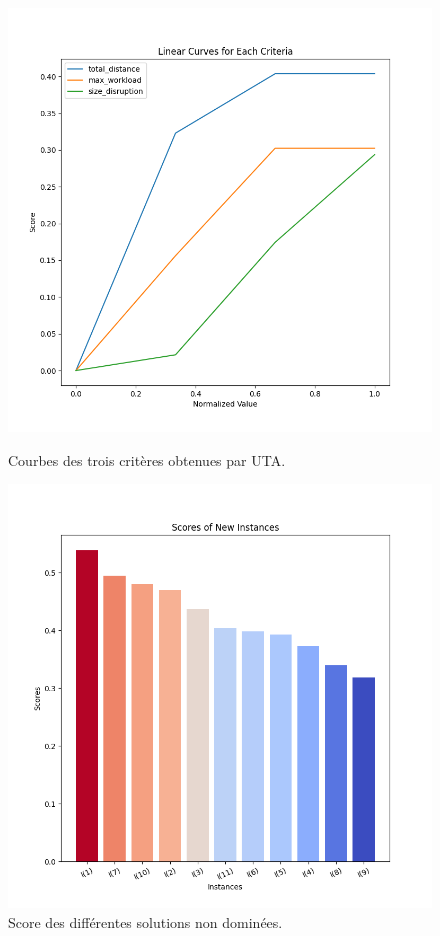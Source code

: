 \documentclass[12pt,a4paper]{article}
\begin{document}
\begin{figure}[H]
    \centering
    \begin{minipage}{0.45\textwidth}
        \centering
        \includegraphics[width=\textwidth]{figures/step4_uta_criterion.png}
        \caption{Courbes des trois critères obtenues par UTA.}
        \label{fig:uta_criterion}
    \end{minipage}
    \hfill
    \begin{minipage}{0.45\textwidth}
        \centering
        \includegraphics[width=\textwidth]{figures/step4_uta_comparision.png}
        \caption{Score des différentes solutions non dominées.}
        \label{fig:uta_comparision}
    \end{minipage}
\end{figure}
\end{document}

